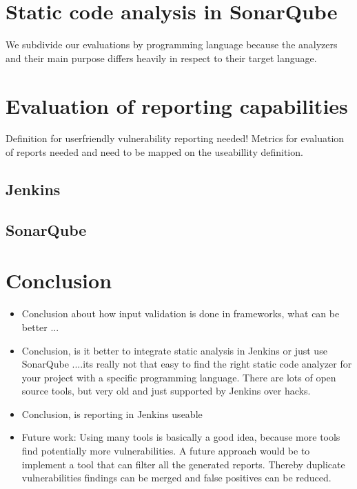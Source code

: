 \documentclass[conference]{IEEEtran}
\begin{document}
\section{Static code analysis in SonarQube}
\label{sec:static_code_analysis_sonarqube}

We subdivide our evaluations by programming language because the analyzers and their main purpose differs heavily in respect to their target language.



\section{Evaluation of reporting capabilities}
\label{sec:evaluation}
Definition for userfriendly vulnerability reporting needed!
Metrics for evaluation of reports needed and need to be mapped on the useabillity definition. 

\subsection{Jenkins}
\label{sec:evaluation_jenkins}

\subsection{SonarQube}
\label{sec:evaluation_sonarqube}




\section{Conclusion}
\label{sec:conclusion}
\begin{itemize}
	\item Conclusion about how input validation is done in frameworks, what can be better ...
	\item Conclusion, is it better to integrate static analysis in Jenkins or just use SonarQube
	....its really not that easy to find the right static code analyzer for your project with a specific programming language. There are lots of open source tools, but very old and just supported by Jenkins over hacks.
	\item Conclusion, is reporting in Jenkins useable
	\item Future work: Using many tools is basically a good idea, because more tools find potentially more vulnerabilities. A future approach would be to implement a tool that can filter all the generated reports. Thereby duplicate vulnerabilities findings can be merged and false positives can be reduced.
\end{itemize}
\end{document}
